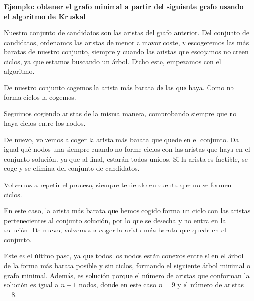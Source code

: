 \documentclass[10pt,a4paper,spanish]{report}
\theoremstyle{definition}
\theoremstyle{remark}
\begin{document}
\textbf{\textcolor{electriccrimson}{Ejemplo}: obtener el grafo minimal a partir del siguiente grafo usando el algoritmo de Kruskal}
\begin{center}
    


Nuestro conjunto de candidatos son las aristas del grafo anterior. Del conjunto de candidatos, ordenamos las aristas de menor a mayor coste, y escogeremos las más baratas de nuestro conjunto, siempre y cuando las aristas que escojamos no creen ciclos, ya que estamos buscando un árbol. Dicho esto, empezamos con el algoritmo.

De nuestro conjunto cogemos la arista más barata de las que haya. Como no forma ciclos la cogemos.



Seguimos cogiendo aristas de la misma manera, comprobando siempre que no haya ciclos entre los nodos.



De nuevo, volvemos a coger la arista más barata que quede en el conjunto. Da igual qué nodos una siempre  cuando no forme ciclos con las aristas que haya en el conjunto solución, ya que al final, estarán todos unidos. Si la arista es factible, se coge y se elimina del conjunto de candidatos.



Volvemos a repetir el proceso, siempre teniendo en cuenta que no se formen ciclos.







En este caso, la arista más barata que hemos cogido forma un ciclo con las aristas pertenecientes al conjunto solución, por lo que se desecha y no entra en la solución. De nuevo, volvemos a coger la arista más barata que quede en el conjunto.







Este es el último paso, ya que todos los nodos están conexos entre sí en el árbol de la forma más barata posible y sin ciclos, formando el siguiente árbol minimal o grafo minimal. Además, es solución porque el número de aristas que conforman la solución es igual a $n-1$ nodos, donde en este caso $n=9$ y el número de aristas = 8.



\end{center}
\end{document}
